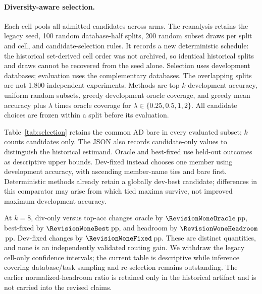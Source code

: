 \paragraph{Diversity-aware selection.} Each cell pools all admitted
candidates across arms. The reanalysis retains the legacy seed, 100
random database-half splits, 200 random subset draws per split and cell,
and candidate-selection rules. It records a new deterministic schedule:
the historical set-derived cell order was not archived, so identical
historical splits and draws cannot be recovered from the seed alone.
Selection uses development databases; evaluation uses the complementary
databases. The overlapping splits are not 1{,}800 independent experiments.
Methods are top-$k$ development accuracy, uniform random subsets, greedy
development oracle coverage, and greedy mean accuracy plus
$\lambda$ times oracle coverage for $\lambda\in\{0.25,0.5,1,2\}$.
All candidate choices are frozen within a split before its evaluation.

Table~\ref{tab:selection} retains the common AD bare in every evaluated
subset; $k$ counts candidates only. The JSON also records candidate-only
values to distinguish the historical estimand. Oracle and best-fixed use
held-out outcomes as descriptive upper bounds. Dev-fixed instead chooses
one member using development accuracy, with ascending member-name ties
and bare first. Deterministic methods already retain a globally dev-best
candidate; differences in this comparator may arise from which tied
maxima survive, not improved maximum development accuracy.

At $k=8$, div-only versus top-acc changes oracle by
$\RevisionWoneOracle$\,pp, best-fixed by $\RevisionWoneBest$\,pp,
and headroom by $\RevisionWoneHeadroom$\,pp. Dev-fixed changes by
$\RevisionWoneFixed$\,pp. These are distinct quantities, and none is an
independently validated routing gain. We withdraw the legacy cell-only
confidence intervals; the current table is descriptive while inference
covering database/task sampling and re-selection remains outstanding.
The earlier normalized-headroom ratio is retained only in the historical
artifact and is not carried into the revised claims.

\begin{table}[t]
\centering\small

\caption{Canonical descriptive W1 reanalysis. Every pool contains $k$
selected candidates plus the common bare. Means over 18 cells and 100
overlapping database splits; no confidence intervals. Dev-fixed is chosen
only on development data; Best uses held-out outcomes.}
\label{tab:selection}
\end{table}


